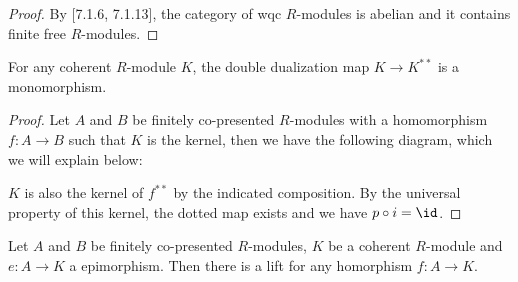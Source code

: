 \begin{proof}
  By \cite{draft}[7.1.6, 7.1.13], the category of wqc $R$-modules is abelian and it contains finite free $R$-modules.
\end{proof}

\begin{lemma}
  \label{coherent-double-dual-mono}
  For any coherent $R$-module $K$, the double dualization map $K\to K^{\ast\ast}$ is a monomorphism.
\end{lemma}

\begin{proof}
  Let $A$ and $B$ be finitely co-presented $R$-modules with a homomorphism $f:A\to B$ such that $K$ is the kernel, then we have the following diagram, which we will explain below:
\begin{center}
\end{center}
$K$ is also the kernel of $f^{\ast\ast}$ by the indicated composition.
By the universal property of this kernel, the dotted map exists and we have $p\circ i=\id$.
\end{proof}

\begin{lemma}
  \label{maps-into-coherent-lift}
  Let $A$ and $B$ be finitely co-presented $R$-modules, $K$ be a coherent $R$-module and $e:A\to K$ a epimorphism.
  Then there is a lift for any homorphism $f:A\to K$.
    \begin{center}
    \end{center}
\end{lemma}

